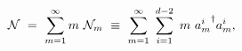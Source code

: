 \begin{equation}  
{\cal N} ~=~ \sum^{\infty}_{m=1} m~{\cal N}_m ~\equiv~ \sum^{\infty}_{m=1}
~\sum^{d-2}_{i=1} ~m~{a^i_m}^\dagger a^i_m,
\end{equation}

